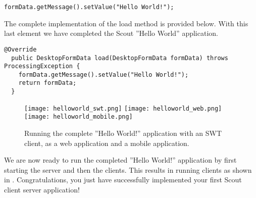 \begin{lstlisting}[backgroundcolor=\color{white}]
  formData.getMessage().setValue("Hello World!");
\end{lstlisting}

The complete implementation of the load method is provided below.
With this last element we have completed the Scout ''Hello World'' application.

\begin{lstlisting}[backgroundcolor=\color{white}]
  @Override
  public DesktopFormData load(DesktopFormData formData) throws ProcessingException {
    formData.getMessage().setValue("Hello World!"); 
    return formData;
  }
\end{lstlisting}

\begin{figure}
\texttt{[image: helloworld\_swt.png]} \hspace{3mm}
\texttt{[image: helloworld\_web.png]} \hspace{3mm}
\texttt{[image: helloworld\_mobile.png]}
\caption{Running the complete ''Hello World!'' application with an SWT client, as a web application and a mobile application.}
\end{figure}

We are now ready to run the completed ''Hello World!'' application by first starting the server and then the clients. 
This results in running clients as shown in . 
Congratulations, you just have successfully implemented your first Scout client server application!

